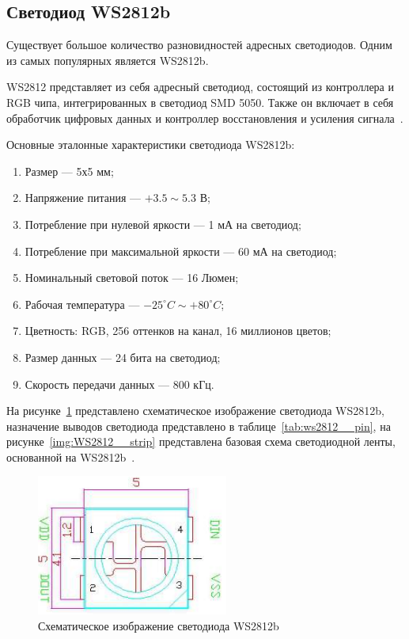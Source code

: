 \subsection{Светодиод WS2812b}

Существует большое количество разновидностей адресных светодиодов. Одним из самых популярных является WS2812b.

WS2812 представляет из себя адресный светодиод, состоящий из контроллера и RGB чипа, интегрированных в светодиод SMD 5050. Также он включает в себя обработчик цифровых данных и контроллер восстановления и усиления сигнала~\cite{Worldseim}.

Основные эталонные характеристики светодиода WS2812b:

\begin{enumerate}
  \item Размер --- 5х5 мм;
  \item Напряжение питания --- $+3.5 \sim 5.3$ В;
  \item Потребление при нулевой яркости --- 1 мА на светодиод;
  \item Потребление при максимальной яркости --- 60 мА на светодиод;
  \item Номинальный световой поток --- 16 Люмен;
  \item Рабочая температура --- $-25^\circ C \sim +80^\circ C$;
  \item Цветность: RGB, 256 оттенков на канал, 16 миллионов цветов;
  \item Размер данных --- 24 бита на светодиод;
  \item Скорость передачи данных --- 800 кГц.
\end{enumerate}

На рисунке~\ref{img:WS2812__schema} представлено схематическое изображение светодиода WS2812b, назначение выводов светодиода представлено в таблице~\ref{tab:ws2812__pin}, на рисунке~\ref{img:WS2812__strip} представлена базовая схема светодиодной ленты, основанной на WS2812b~\cite{Worldseim}.

\begin{figure}[H]
  \centering
  \includegraphics[height=0.2\textheight]{assets/images/theoretical/Схема светодиода.png}
  \caption{Схематическое изображение светодиода WS2812b}
  \label{img:WS2812__schema}
\end{figure}

